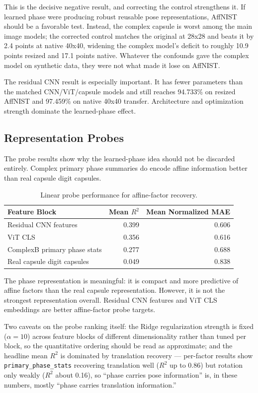 \documentclass[11pt]{article}
\begin{document}
This is the decisive negative result, and correcting the control strengthens it. If learned phase were producing robust reusable pose representations, AffNIST should be a favorable test. Instead, the complex capsule is worst among the main image models; the corrected control matches the original at 28x28 and beats it by 2.4 points at native 40x40, widening the complex model's deficit to roughly 10.9 points resized and 17.1 points native. Whatever the confounds gave the complex model on synthetic data, they were not what made it lose on AffNIST.

The residual CNN result is especially important. It has fewer parameters than the matched CNN/ViT/capsule models and still reaches 94.733\% on resized AffNIST and 97.459\% on native 40x40 transfer. Architecture and optimization strength dominate the learned-phase effect.

\subsection{Representation Probes}
The probe results show why the learned-phase idea should not be discarded entirely. Complex primary phase summaries do encode affine information better than real capsule digit capsules.

\begin{table}[t]
\centering
\small
\begin{tabular}{lrr}
\toprule
Feature Block & Mean $R^2$ & Mean Normalized MAE \\
\midrule
Residual CNN features & 0.399 & 0.606 \\
ViT CLS & 0.356 & 0.616 \\
ComplexB primary phase stats & 0.277 & 0.688 \\
Real capsule digit capsules & 0.049 & 0.838 \\
\bottomrule
\end{tabular}
\caption{Linear probe performance for affine-factor recovery.}
\label{tab:probes}
\end{table}

The phase representation is meaningful: it is compact and more predictive of affine factors than the real capsule representation. However, it is not the strongest representation overall. Residual CNN features and ViT CLS embeddings are better affine-factor probe targets.

Two caveats on the probe ranking itself: the Ridge regularization strength is fixed ($\alpha = 10$) across feature blocks of different dimensionality rather than tuned per block, so the quantitative ordering should be read as approximate; and the headline mean $R^2$ is dominated by translation recovery --- per-factor results show \texttt{primary\_phase\_stats} recovering translation well ($R^2$ up to 0.86) but rotation only weakly ($R^2$ about 0.16), so ``phase carries pose information'' is, in these numbers, mostly ``phase carries translation information.''
\end{document}
